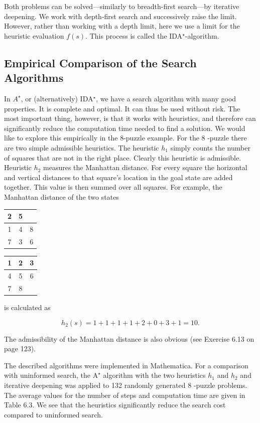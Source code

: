 \documentclass[10pt]{book}
\begin{document}
Both problems can be solved—similarly to breadth-first search—by iterative deepening. We work with depth-first search and successively raise the limit. However, rather than working with a depth limit, here we use a limit for the heuristic evaluation $f(s)$. This process is called the IDA$^{\star}$-algorithm.

\subsection{Empirical Comparison of the Search Algorithms}
In $A^{\star}$, or (alternatively) IDA$^{\star}$, we have a search algorithm with many good properties. It is complete and optimal. It can thus be used without risk. The most important thing, however, is that it works with heuristics, and therefore can significantly reduce the computation time needed to find a solution. We would like to explore this empirically in the 8-puzzle example.
For the 8 -puzzle there are two simple admissible heuristics. The heuristic $h_{1}$ simply counts the number of squares that are not in the right place. Clearly this heuristic is admissible. Heuristic $h_{2}$ measures the Manhattan distance. For every square the horizontal and vertical distances to that square's location in the goal state are added together. This value is then summed over all squares. For example, the Manhattan distance of the two states

\begin{center}
\begin{tabular}{|c|c|c|}
\hline
2 & 5 &  \\
\hline
1 & 4 & 8 \\
\hline
7 & 3 & 6 \\
\hline
\end{tabular}
\qquad
\begin{tabular}{|c|c|c|}
\hline
1 & 2 & 3 \\
\hline
4 & 5 & 6 \\
\hline
7 & 8 &  \\
\hline
\end{tabular}
\end{center}

is calculated as

$$
h_{2}(s)=1+1+1+1+2+0+3+1=10 .
$$

The admissibility of the Manhattan distance is also obvious (see Exercise 6.13 on page 123).

The described algorithms were implemented in Mathematica. For a comparison with uninformed search, the $\mathrm{A}^{\star}$ algorithm with the two heuristics $h_{1}$ and $h_{2}$ and iterative deepening was applied to 132 randomly generated 8 -puzzle problems. The average values for the number of steps and computation time are given in Table 6.3. We see that the heuristics significantly reduce the search cost compared to uninformed search.
\end{document}
